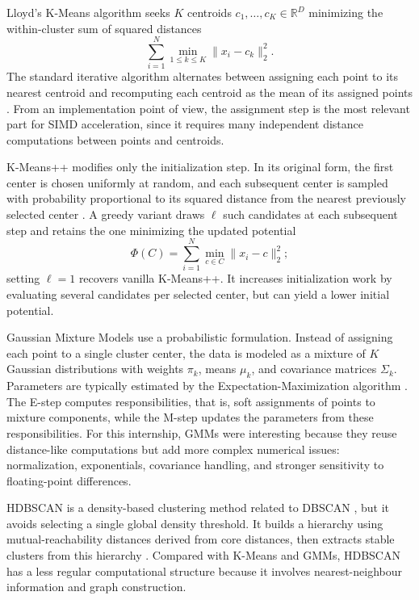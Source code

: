 \documentclass[11pt,a4paper]{article}
\newcommand{\R}{\mathbb{R}}
\begin{document}
Lloyd's K-Means algorithm seeks \(K\) centroids \(c_1,\ldots,c_K \in \R^D\) minimizing the within-cluster sum of squared distances
\[
  \sum_{i=1}^N \min_{1 \leq k \leq K} \|x_i - c_k\|_2^2.
\]
The standard iterative algorithm alternates between assigning each point to its nearest centroid and recomputing each centroid as the mean of its assigned points \cite{lloyd1982}. From an implementation point of view, the assignment step is the most relevant part for SIMD acceleration, since it requires many independent distance computations between points and centroids.

K-Means++ modifies only the initialization step. In its original form, the first center is chosen uniformly at random, and each subsequent center is sampled with probability proportional to its squared distance from the nearest previously selected center \cite{arthur2007kmeanspp}. A greedy variant \cite{grunau2023greedy} draws \(\ell\) such candidates at each subsequent step and retains the one minimizing the updated potential
\[  \Phi(C) = \sum_{i=1}^N \min_{c \in C} \|x_i-c\|_2^2 ; \]
setting \(\ell=1\) recovers vanilla K-Means++. It increases initialization work by evaluating several candidates per selected center, but can yield a lower initial potential.

Gaussian Mixture Models use a probabilistic formulation. Instead of assigning each point to a single cluster center, the data is modeled as a mixture of \(K\) Gaussian distributions with weights \(\pi_k\), means \(\mu_k\), and covariance matrices \(\Sigma_k\). Parameters are typically estimated by the Expectation-Maximization algorithm \cite{dempster1977em}. The E-step computes responsibilities, that is, soft assignments of points to mixture components, while the M-step updates the parameters from these responsibilities. For this internship, GMMs were interesting because they reuse distance-like computations but add more complex numerical issues: normalization, exponentials, covariance handling, and stronger sensitivity to floating-point differences.

HDBSCAN is a density-based clustering method related to DBSCAN \cite{ester1996dbscan}, but it avoids selecting a single global density threshold. It builds a hierarchy using mutual-reachability distances derived from core distances, then extracts stable clusters from this hierarchy \cite{campello2013hdbscan,mcinnes2017hdbscan}. Compared with K-Means and GMMs, HDBSCAN has a less regular computational structure because it involves nearest-neighbour information and graph construction.
\end{document}
